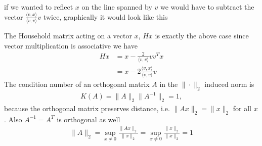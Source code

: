 if we wanted to reflect $x$ on the line spanned by $v$ we would have to
subtract the vector $\frac{\langle v, x \rangle}{\langle v, v \rangle} v$
twice, graphically it would look like this
\begin{figure}[H]
    \centering
\end{figure}
The Household matrix acting on a vector $x$, $Hx$ is exactly the above case
since vector multiplication is associative we have
\begin{align}
    Hx &= x - \frac{2}{\langle v, v \rangle} vv^T x\\
       &= x - 2\frac{\langle v, x\rangle}{\langle v, v \rangle} v
\end{align}
The condition number of an orthogonal matrix $A$ in the $\|\cdot\|_2$ induced
norm is
\begin{align}
    K(A) =  \|A\|_2 \|A^{-1}\|_2 = 1,
\end{align}
because the orthogonal matrix preserves distance, i.e. $\|Ax\|_2 = \|x\|_2$
for all $x$. Also $A^{-1} =A^T$ is orthogonal as well
\begin{align}
    \|A\|_2 = \sup_{x\neq 0} \frac{\|Ax\|_2}{\|x\|_2} = \sup_{x \neq 0} \frac{\|x\|_2}{\|x\|_2} =
    1
\end{align}


